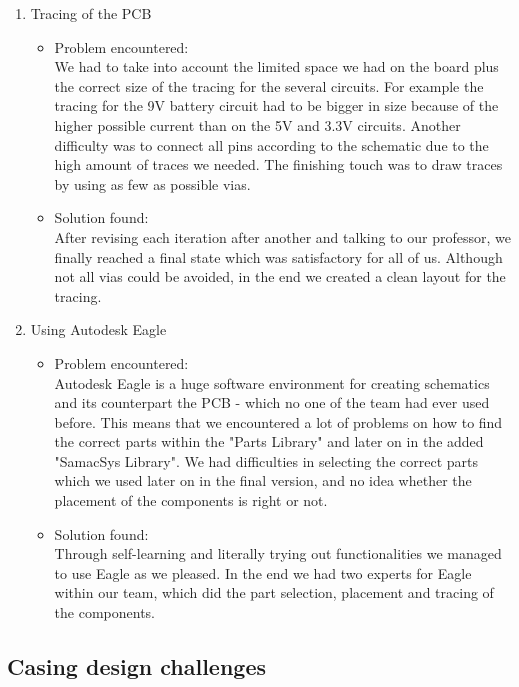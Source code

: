 \begin{enumerate}
  \item Tracing of the PCB
    \begin{itemize}
      \item Problem encountered:\\
      We had to take into account the limited space we had on the board plus the correct size of the tracing for the several circuits. For example the tracing for the 9V battery circuit had to be bigger in size because of the higher possible current than on the 5V and 3.3V circuits.
      Another difficulty was to connect all pins according to the schematic due to the high amount of traces we needed. The finishing touch was to draw traces by using as few as possible vias.
      \item Solution found:\\
      After revising each iteration after another and talking to our professor, we finally reached a final state which was satisfactory for all of us. Although not all vias could be avoided, in the end we created a clean layout for the tracing.
    \end{itemize}
  \item Using Autodesk Eagle
    \begin{itemize}
      \item Problem encountered:\\
      Autodesk Eagle is a huge software environment for creating schematics and its counterpart the PCB - which no one of the team had ever used before. This means that we encountered a lot of problems on how to find the correct parts within the "Parts Library" and later on in the added "SamacSys Library". We had difficulties in selecting the correct parts which we used later on in the final version, and no idea whether the placement of the components is right or not. 
      \item Solution found:\\
      Through self-learning and literally trying out functionalities we managed to use Eagle as we pleased. In the end we had two experts for Eagle within our team, which did the part selection, placement and tracing of the components.
    \end{itemize}
\end{enumerate}

\subsection{Casing design challenges}

